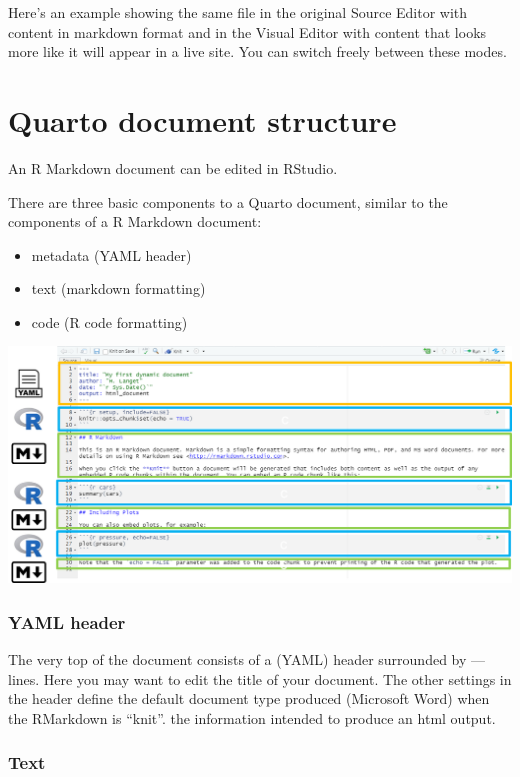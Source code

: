 \documentclass[
  letterpaper,
  DIV=11,
  numbers=noendperiod,
  oneside]{scrreprt}
\providecommand{\tightlist}{%
  \setlength{\itemsep}{0pt}\setlength{\parskip}{0pt}}\usepackage{longtable,booktabs,array}
\begin{document}
Here's an example showing the same file in the original Source Editor
with content in markdown format and in the Visual Editor with content
that looks more like it will appear in a live site. You can switch
freely between these modes.

\hypertarget{quarto-document-structure}{%
\section{Quarto document structure}\label{quarto-document-structure}}

An R Markdown document can be edited in RStudio.

There are three basic components to a Quarto document, similar to the
components of a R Markdown document:

\begin{itemize}
\tightlist
\item
  metadata (YAML header)
\item
  text (markdown formatting)
\item
  code (R code formatting)
\end{itemize}

\includegraphics{./images/paste-30C30ECC.png}

\hypertarget{yaml-header}{%
\subsubsection{YAML header}\label{yaml-header}}

The very top of the document consists of a (YAML) header surrounded by
--- lines. Here you may want to edit the title of your document. The
other settings in the header define the default document type produced
(Microsoft Word) when the RMarkdown is ``knit''. the information
intended to produce an html output.

\hypertarget{text}{%
\subsubsection{Text}\label{text}}
\end{document}
